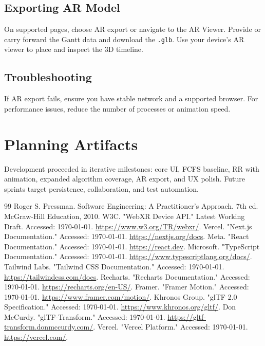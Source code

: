 \documentclass[12pt,a4paper,oneside]{report}
\begin{document}
\section*{Exporting AR Model}
On supported pages, choose AR export or navigate to the AR Viewer. Provide or carry forward the Gantt data and download the \texttt{.glb}. Use your device’s AR viewer to place and inspect the 3D timeline.

\section*{Troubleshooting}
If AR export fails, ensure you have stable network and a supported browser. For performance issues, reduce the number of processes or animation speed.

\chapter{Planning Artifacts}
Development proceeded in iterative milestones: core UI, FCFS baseline, RR with animation, expanded algorithm coverage, AR export, and UX polish. Future sprints target persistence, collaboration, and test automation.

\clearpage
\renewcommand\bibname{References}
\begin{thebibliography}{99}
\setlength{\itemsep}{\baselineskip} %
\setlength{\parsep}{0pt}
\setlength{\parskip}{0pt}
\small %
 Roger S. Pressman. Software Engineering: A Practitioner’s Approach. 7th ed. McGraw-Hill Education, 2010.
 W3C. "WebXR Device API." Latest Working Draft. Accessed: \today. \url{https://www.w3.org/TR/webxr/}.
 Vercel. "Next.js Documentation." Accessed: \today. \url{https://nextjs.org/docs}.
 Meta. "React Documentation." Accessed: \today. \url{https://react.dev}.
 Microsoft. "TypeScript Documentation." Accessed: \today. \url{https://www.typescriptlang.org/docs/}.
 Tailwind Labs. "Tailwind CSS Documentation." Accessed: \today. \url{https://tailwindcss.com/docs}.
 Recharts. "Recharts Documentation." Accessed: \today. \url{https://recharts.org/en-US/}.
 Framer. "Framer Motion." Accessed: \today. \url{https://www.framer.com/motion/}.
 Khronos Group. "glTF 2.0 Specification." Accessed: \today. \url{https://www.khronos.org/gltf/}.
 Don McCurdy. "glTF-Transform." Accessed: \today. \url{https://gltf-transform.donmccurdy.com/}.
 Vercel. "Vercel Platform." Accessed: \today. \url{https://vercel.com/}.
\end{thebibliography}
\end{document}
